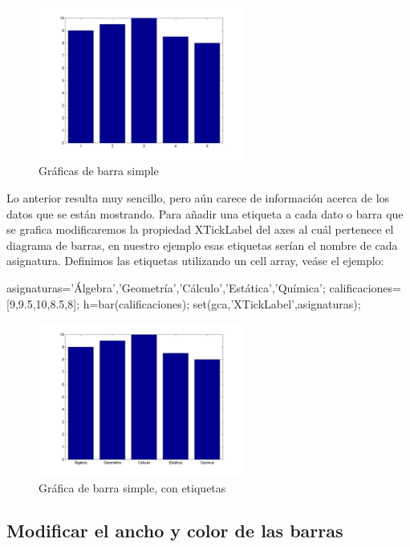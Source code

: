\begin{figure}[!h]
\centering
\includegraphics[width=0.6\textwidth]{images/ch4/barra_simple.png}
\caption{Gráficas de barra simple}
\label{fig:barra_simple}
\end{figure}

Lo anterior resulta muy sencillo, pero aún carece de información acerca de los datos que 
se están mostrando. Para añadir una etiqueta a cada dato o barra que se grafica modificaremos 
la propiedad XTickLabel del axes al cuál pertenece el diagrama de barras, en nuestro ejemplo 
esas etiquetas serían el nombre de cada asignatura. Definimos las etiquetas utilizando un 
cell array, veáse el ejemplo:

\begin{matlab}
asignaturas={'Álgebra','Geometría','Cálculo','Estática','Química'};
calificaciones=[9,9.5,10,8.5,8];
h=bar(calificaciones);
set(gca,'XTickLabel',asignaturas);
\end{matlab}

\begin{figure}[!h]
\centering
\includegraphics[width=0.6\textwidth]{images/ch4/barra_simple_02.png}
\caption{Gráfica de barra simple, con etiquetas}
\label{fig:barra_simple_02}
\end{figure}

\subsection{Modificar el ancho y color de las barras}

